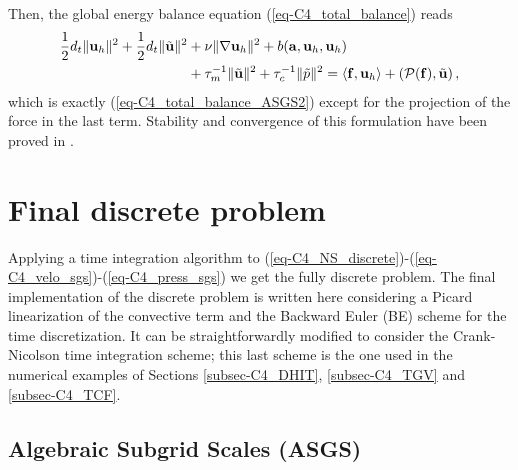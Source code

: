 Then, the global energy balance equation (\ref{eq-C4_total_balance}) reads
\begin{align}
\label{eq-C4_total_balance_OSS2}
\frac{1}{2}d_t\|\u_h\|^2+\frac{1}{2}d_t\|\tilde{\u}\|^2
&+\nu\|\nabla\u_h\|^2+b(\a,\u_h,\u_h) \\ \nonumber
&+\tau_m^{-1}\|\tilde{\u}\|^2+\tau_c^{-1}\|\tilde{p}\|^2 %
=\left<\mathbf{f},\mathbf{u}_h\right>+\left(\mathcal{P}(\mathbf{f}),\tilde{\u}\right),
\end{align}
which is exactly (\ref{eq-C4_total_balance_ASGS2}) except for the projection of the force in the last term. Stability and convergence of this formulation have been proved in \cite{Badia2010,Badia2013Convergence}.

\section{Final discrete problem}
\label{sec-C4_discrete}
Applying a time integration algorithm to (\ref{eq-C4_NS_discrete})-(\ref{eq-C4_velo_sgs})-(\ref{eq-C4_press_sgs}) we get the fully discrete problem. The final implementation of the discrete problem is written here considering a Picard linearization of the convective term and the Backward Euler (BE) scheme for the time discretization. It can be straightforwardly modified to consider the Crank-Nicolson time integration scheme; this last scheme is the one used in the numerical examples of Sections \ref{subsec-C4_DHIT},  \ref{subsec-C4_TGV} and \ref{subsec-C4_TCF}.

\subsection{Algebraic Subgrid Scales (ASGS)}

